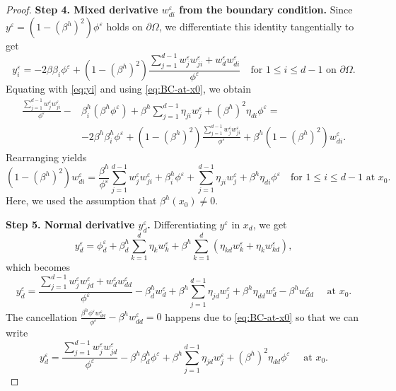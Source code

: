 \documentclass[11pt]{article}
\numberwithin{equation}{section}
\def\le{\leqslant}
\begin{document}
\begin{proof}
\textbf{Step 4. Mixed derivative $w^\varepsilon_{di}$ from the boundary condition.} Since $y^\varepsilon = (1-(\beta^h)^2)\phi^\varepsilon$ holds on $\partial\Omega$, we differentiate this identity tangentially to get
\[
y^\varepsilon_i = -2\beta \beta_i \phi^\varepsilon + (1-(\beta^h)^2)\frac{\sum_{j=1}^{d-1} w^\varepsilon_j w^\varepsilon_{ji} + w^\varepsilon_d w^\varepsilon_{di}}{\phi^\varepsilon}\quad\text{for $1 \le i \le d-1$ on $\partial\Omega$}.
\]
Equating with \eqref{eq:yi} and using \eqref{eq:BC-at-x0}, we obtain
\begin{align*}
\frac{\sum_{j=1}^{d-1} w^\varepsilon_j w^\varepsilon_{ji}}{\phi^\varepsilon} -& \beta^h_i (\beta^h \phi^\varepsilon) + \beta^h \sum_{j=1}^{d-1} \eta_{ji} w^\varepsilon_j + (\beta^h)^2 \eta_{di} \phi^\varepsilon = \\
&-2\beta^h \beta^h_i \phi^\varepsilon + (1-(\beta^h)^2)\frac{\sum_{j=1}^{d-1} w^\varepsilon_j w^\varepsilon_{ji}}{\phi^\varepsilon} + \beta^h(1-(\beta^h)^2) w^\varepsilon_{di}.
\end{align*}
Rearranging yields
\begin{equation} \label{eq:wdi}
(1-(\beta^h)^2) w^\varepsilon_{di} = \frac{\beta^h}{\phi^{\varepsilon}} \sum_{j=1}^{d-1} w^\varepsilon_j w^\varepsilon_{ji} + \beta^h_i \phi^\varepsilon + \sum_{j=1}^{d-1} \eta_{ji} w^\varepsilon_j + \beta^h \eta_{di} \phi^\varepsilon\quad\text{for $1 \le i \le d-1$ at $x_0$}.
\end{equation}
Here, we used the assumption that $\beta^h(x_0)\neq0$.%

\medskip

\textbf{Step 5. Normal derivative $y^\varepsilon_d$.} Differentiating $y^\varepsilon$ in $x_d$, we get
\[
y^\varepsilon_d = \phi_d^\varepsilon + \beta^h_d \sum_{k=1}^d \eta_k w^\varepsilon_k + \beta^h \sum_{k=1}^d (\eta_{kd} w^\varepsilon_k + \eta_k w^\varepsilon_{kd}),
\]
which becomes
\[
y^\varepsilon_d = \frac{\sum_{j=1}^{d-1} w^\varepsilon_j w^\varepsilon_{jd} + w^\varepsilon_d w^\varepsilon_{dd}}{\phi^\varepsilon} - \beta^h_d w^\varepsilon_d + \beta^h \sum_{j=1}^{d-1} \eta_{jd} w^\varepsilon_j + \beta^h \eta_{dd} w^\varepsilon_d - \beta^h w^\varepsilon_{dd}\quad\text{ at $x_0$}.
\]
The cancellation $\frac{\beta^h \phi^\varepsilon w^\varepsilon_{dd}}{\phi^\varepsilon} - \beta^h w^\varepsilon_{dd} = 0$ happens due to \eqref{eq:BC-at-x0} so that we can write
\begin{equation} \label{eq:yd}
y^\varepsilon_d = \frac{\sum_{j=1}^{d-1} w^\varepsilon_j w^\varepsilon_{jd}}{\phi^\varepsilon} - \beta^h \beta^h_d \phi^\varepsilon + \beta^h \sum_{j=1}^{d-1} \eta_{jd} w^\varepsilon_j + (\beta^h)^2 \eta_{dd} \phi^\varepsilon\quad\text{ at $x_0$}.
\end{equation}


\end{proof}
\end{document}
